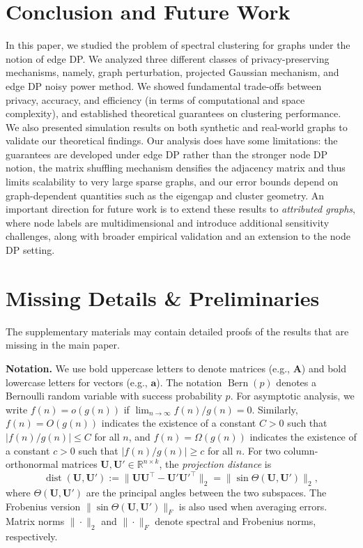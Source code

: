 \documentclass[11pt]{article}
\theoremstyle{plain}
\theoremstyle{definition}
\theoremstyle{remark}
\begin{document}
\section{Conclusion and Future Work}
\label{sec:conclusion}


In this paper, we studied the problem of spectral clustering for graphs under the notion of edge DP. We analyzed three different classes of privacy-preserving mechanisms, namely, graph perturbation, projected Gaussian mechanism, and edge DP noisy power method. We showed fundamental trade-offs between privacy, accuracy, and efficiency (in terms of computational and space complexity), and established theoretical guarantees on clustering performance. We also presented simulation results on both synthetic and real-world graphs to validate our theoretical findings. Our analysis does have some limitations: the guarantees are developed under edge DP rather than the stronger node DP notion, the matrix shuffling mechanism densifies the adjacency matrix and thus limits scalability to very large sparse graphs, and our error bounds depend on graph-dependent quantities such as the eigengap and cluster geometry. An important direction for future work is to extend these results to \emph{attributed graphs}, where node labels are multidimensional and introduce additional sensitivity challenges, along with broader empirical validation and an extension to the node DP setting.




\newpage


\appendix





\section{Missing Details \& Preliminaries}

The supplementary materials may contain detailed proofs of the results that are missing in the main paper.


\noindent \textbf{Notation.} We use bold uppercase letters to denote matrices (e.g., $\mathbf{A}$) and bold lowercase letters for vectors (e.g., $\mathbf{a}$). The notation $\operatorname{Bern}(p)$ denotes a Bernoulli random variable with success probability $p$. For asymptotic analysis, we write $f(n) = o(g(n))$ if $\lim_{n \to \infty} f(n)/g(n) = 0$. Similarly, $f(n) = O(g(n))$ indicates the existence of a constant $C > 0$ such that $|f(n)/g(n)| \leq C$ for all $n$, and $f(n) = \Omega(g(n))$ indicates the existence of a constant $c > 0$ such that $|f(n)/g(n)| \geq c$ for all $n$. 
For two column-orthonormal matrices $\mathbf{U},\mathbf{U}'\in\mathbb{R}^{n\times k}$, 
the \emph{projection distance} is
\[
\operatorname{dist}(\mathbf{U},\mathbf{U}')
:= \|\mathbf{U}\mathbf{U}^{\top} - \mathbf{U}'\mathbf{U}'^{\top}\|_{2}
= \|\sin\Theta(\mathbf{U},\mathbf{U}')\|_{2},
\]
where $\Theta(\mathbf{U},\mathbf{U}')$ are the principal angles between the two subspaces. 
The Frobenius version $\|\sin\Theta(\mathbf{U},\mathbf{U}')\|_{F}$ is also used when averaging errors. 
Matrix norms $\|\cdot\|_{2}$ and $\|\cdot\|_{F}$ denote spectral and Frobenius norms, respectively.
\end{document}
